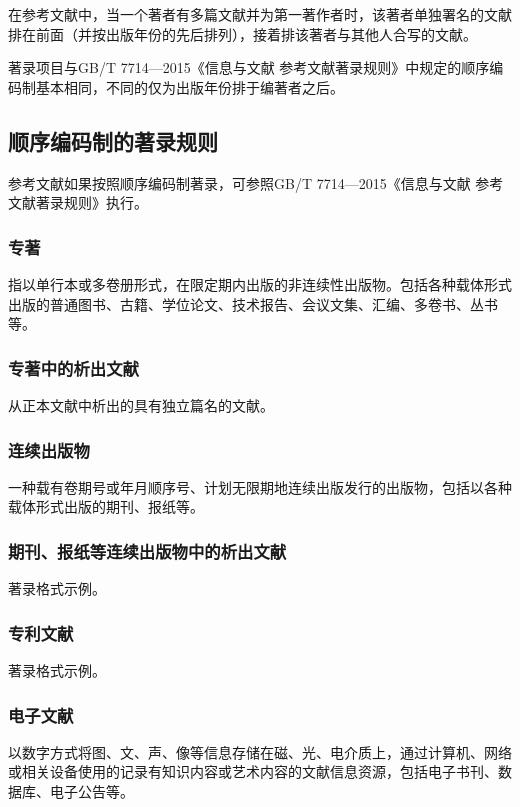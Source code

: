 在参考文献中，当一个著者有多篇文献并为第一著作者时，该著者单独署名的文献排在前面（并按出版年份的先后排列），接着排该著者与其他人合写的文献。

著录项目与GB/T 7714—2015《信息与文献 参考文献著录规则》中规定的顺序编码制基本相同，不同的仅为出版年份排于编著者之后。

\subsection{顺序编码制的著录规则}

参考文献如果按照顺序编码制著录，可参照GB/T 7714—2015《信息与文献 参考文献著录规则》执行。

\subsubsection{专著}

指以单行本或多卷册形式，在限定期内出版的非连续性出版物。包括各种载体形式出版的普通图书、古籍、学位论文、技术报告、会议文集、汇编、多卷书、丛书等。
\cite{li2002,tian1986,zhao1998,xin1994,peebles2001,lin2006}

\subsubsection{专著中的析出文献}

从正本文献中析出的具有独立篇名的文献。
\cite{cheng1999}

\subsubsection{连续出版物}

一种载有卷期号或年月顺序号、计划无限期地连续出版发行的出版物，包括以各种载体形式出版的期刊、报纸等。
\cite{zhong1936,zhongtu1957}

\subsubsection{期刊、报纸等连续出版物中的析出文献}

著录格式示例。
\cite{wang2011shu,zheng2000yun,fu2000da}

\subsubsection{专利文献}

著录格式示例。
\cite{jiang1989,xi2002}

\subsubsection{电子文献}

以数字方式将图、文、声、像等信息存储在磁、光、电介质上，通过计算机、网络或相关设备使用的记录有知识内容或艺术内容的文献信息资源，包括电子书刊、数据库、电子公告等。
\cite{oclc}

